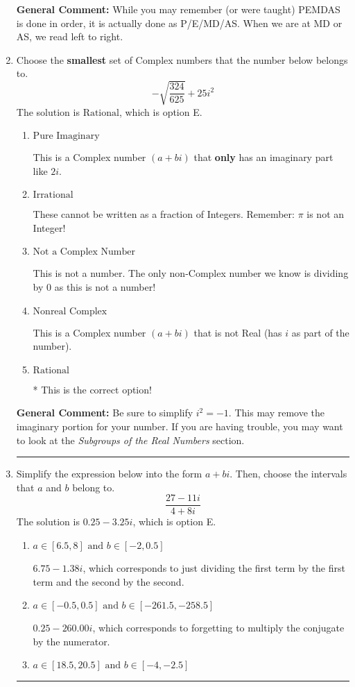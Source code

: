 \documentclass{extbook}[14pt]
\newcommand{\litem}[1]{\item #1

\rule{\textwidth}{0.4pt}}
\begin{document}
\begin{enumerate}
{\textbf{General Comment:} While you may remember (or were taught) PEMDAS is done in order, it is actually done as P/E/MD/AS. When we are at MD or AS, we read left to right.
}
\litem{
Choose the \textbf{smallest} set of Complex numbers that the number below belongs to.
\[ -\sqrt{\frac{324}{625}} + 25i^2 \]The solution is \( \text{Rational} \), which is option E.\begin{enumerate}[label=\Alph*.]
\item \( \text{Pure Imaginary} \)

This is a Complex number $(a+bi)$ that \textbf{only} has an imaginary part like $2i$.
\item \( \text{Irrational} \)

These cannot be written as a fraction of Integers. Remember: $\pi$ is not an Integer!
\item \( \text{Not a Complex Number} \)

This is not a number. The only non-Complex number we know is dividing by 0 as this is not a number!
\item \( \text{Nonreal Complex} \)

This is a Complex number $(a+bi)$ that is not Real (has $i$ as part of the number).
\item \( \text{Rational} \)

* This is the correct option!
\end{enumerate}

\textbf{General Comment:} Be sure to simplify $i^2 = -1$. This may remove the imaginary portion for your number. If you are having trouble, you may want to look at the \textit{Subgroups of the Real Numbers} section.
}
\litem{
Simplify the expression below into the form $a+bi$. Then, choose the intervals that $a$ and $b$ belong to.
\[ \frac{27 - 11 i}{4 + 8 i} \]The solution is \( 0.25  - 3.25 i \), which is option E.\begin{enumerate}[label=\Alph*.]
\item \( a \in [6.5, 8] \text{ and } b \in [-2, 0.5] \)

 $6.75  - 1.38 i$, which corresponds to just dividing the first term by the first term and the second by the second.
\item \( a \in [-0.5, 0.5] \text{ and } b \in [-261.5, -258.5] \)

 $0.25  - 260.00 i$, which corresponds to forgetting to multiply the conjugate by the numerator.
\item \( a \in [18.5, 20.5] \text{ and } b \in [-4, -2.5] \)


\end{enumerate}}
\end{enumerate}
\end{document}
